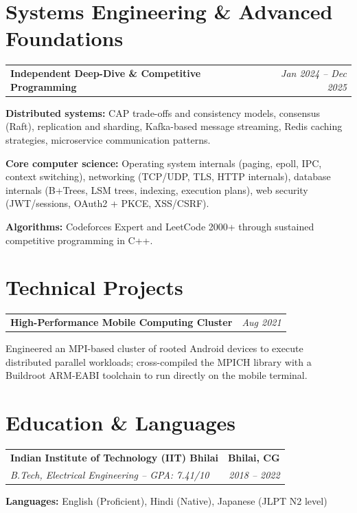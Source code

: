 \documentclass[a4paper,10pt]{article}
\makeatletter
\newcommand{\heading}[4]{%
  \begin{tabular*}{\textwidth}{@{}l@{\extracolsep{\fill}}r@{}}
    \textbf{#1} & \textbf{#2} \\
    \textit{#3} & \textit{#4} \\
  \end{tabular*}\vspace{2pt}}
\newcommand{\headingone}[2]{%
  \begin{tabular*}{\textwidth}{@{}l@{\extracolsep{\fill}}r@{}}
    \textbf{#1} & \textit{#2} \\
  \end{tabular*}\vspace{1pt}}
\makeatother
\begin{document}
\section{Systems Engineering \& Advanced Foundations}
\headingone{Independent Deep-Dive \& Competitive Programming}{Jan 2024 -- Dec 2025}
\begin{bullets}\small
  \item \textbf{Distributed systems:} CAP trade-offs and consistency models, consensus (Raft), replication and sharding, Kafka-based message streaming, Redis caching strategies, microservice communication patterns.
  \item \textbf{Core computer science:} Operating system internals (paging, epoll, IPC, context switching), networking (TCP/UDP, TLS, HTTP internals), database internals (B+Trees, LSM trees, indexing, execution plans), web security (JWT/sessions, OAuth2 + PKCE, XSS/CSRF).
  \item \textbf{Algorithms:} Codeforces Expert and LeetCode 2000+ through sustained competitive programming in C++.
\end{bullets}

\section{Technical Projects}
\headingone{High-Performance Mobile Computing Cluster \normalfont{-- C++, MPI, Buildroot, Linux}}{Aug 2021}
\begin{bullets}\small
  \item Engineered an MPI-based cluster of rooted Android devices to execute distributed parallel workloads; cross-compiled the MPICH library with a Buildroot ARM-EABI toolchain to run directly on the mobile terminal.
\end{bullets}

\section{Education \& Languages}
\heading{Indian Institute of Technology (IIT) Bhilai}{Bhilai, CG}{B.Tech, Electrical Engineering -- GPA: 7.41/10}{2018 -- 2022}
\vspace{2pt}
\small\textbf{Languages:} English (Proficient), Hindi (Native), Japanese (JLPT N2 level)
\end{document}
